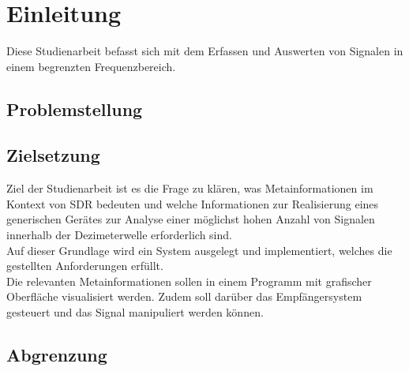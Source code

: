 
\chapter{Einleitung}
Diese Studienarbeit befasst sich mit dem Erfassen und Auswerten von Signalen in einem begrenzten Frequenzbereich.  

\section{Problemstellung}


\section{Zielsetzung}
Ziel der Studienarbeit ist es die Frage zu klären, was Metainformationen im Kontext von \ac{SDR} bedeuten und welche Informationen zur Realisierung eines generischen Gerätes zur Analyse einer möglichst hohen Anzahl von Signalen innerhalb der Dezimeterwelle erforderlich sind.\\

Auf dieser Grundlage wird ein System ausgelegt und implementiert, welches die gestellten Anforderungen erfüllt.\\

Die relevanten Metainformationen sollen in einem Programm mit grafischer Oberfläche visualisiert werden. Zudem soll darüber das Empfängersystem gesteuert und das Signal manipuliert werden können.





\section{Abgrenzung}


